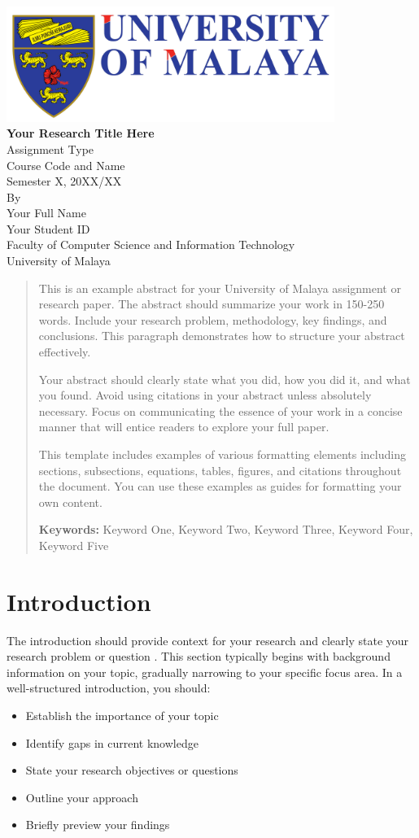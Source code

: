 \documentclass[11pt]{article}
\makeatletter
\def\maketitle{
 \begin{titlepage}
   \begin{center}
     \vspace*{.5cm}
     \includegraphics[width=0.8\textwidth,height=0.3\textheight,keepaspectratio]{UM_LOGO}\\[2cm]
     {\LARGE\textbf{Your Research Title Here}}\\[.5cm]
     
     {\Large Assignment Type}\\[0.5cm]
     
     {\large Course Code and Name}\\[0.5cm]
     
     {\large Semester X, 20XX/XX}\\[2cm]
     
     {\large By}\\[0.5cm]
     {\large Your Full Name}\\
     {\large Your Student ID}\\[2cm]
     
     {\large Faculty of Computer Science and Information Technology}\\
     {\large University of Malaya}\\[1cm]
     
     {\large \@date}
   \end{center}
 \end{titlepage}
}
\makeatother
\begin{document}
\begin{titlepage}
\maketitle
\end{titlepage}


\begin{abstract}
This is an example abstract for your University of Malaya assignment or research paper. The abstract should summarize your work in 150-250 words. Include your research problem, methodology, key findings, and conclusions. This paragraph demonstrates how to structure your abstract effectively.

Your abstract should clearly state what you did, how you did it, and what you found. Avoid using citations in your abstract unless absolutely necessary. Focus on communicating the essence of your work in a concise manner that will entice readers to explore your full paper.

This template includes examples of various formatting elements including sections, subsections, equations, tables, figures, and citations throughout the document. You can use these examples as guides for formatting your own content.

\noindent \textbf{Keywords:} Keyword One, Keyword Two, Keyword Three, Keyword Four, Keyword Five
\end{abstract}



\section{Introduction}

The introduction should provide context for your research and clearly state your research problem or question \cite{smith2020example}. This section typically begins with background information on your topic, gradually narrowing to your specific focus area. In a well-structured introduction, you should:

\begin{itemize}
    \item Establish the importance of your topic
    \item Identify gaps in current knowledge
    \item State your research objectives or questions
    \item Outline your approach
    \item Briefly preview your findings
\end{itemize}
\end{document}
